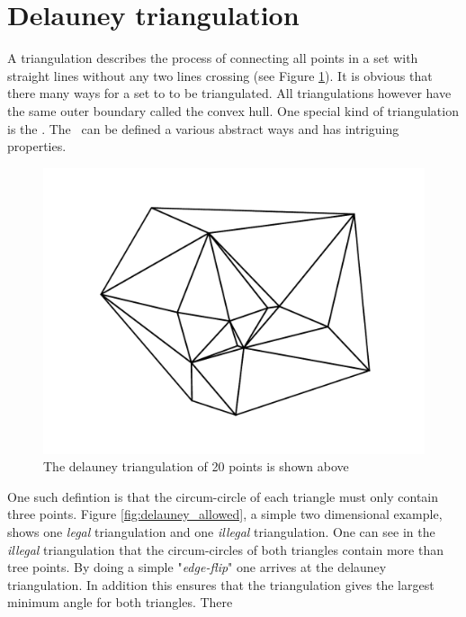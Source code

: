\section{Delauney triangulation}
\label{sec:delauney_tri}
A triangulation describes the process of connecting all points in a set with straight lines without any two lines crossing (see Figure \ref{fig:delauney_example}). It is obvious that there many ways for a set to to be triangulated. All triangulations however have the same outer boundary called the convex hull. One special kind of triangulation is the \deltri. The \deltri\ can be defined a various abstract ways and has intriguing properties.

\begin{figure}[htbp] %
   \centering
   \includegraphics[width=\textwidth]{chapter_ndinterp/plots/simple_delauney.pdf} 
   \caption{The delauney triangulation of 20 points is shown above}
   \label{fig:delauney_example}
\end{figure}


One such defintion is that the circum-circle of each triangle must only contain three points. Figure \ref{fig:delauney_allowed}, a simple two dimensional example, shows one \textit{legal} triangulation and one \textit{illegal} triangulation. One can see in the \textit{illegal} triangulation that the circum-circles of both triangles contain more than tree points. By doing a simple "\textit{edge-flip}" one arrives at the delauney triangulation. In addition this ensures that the triangulation gives the largest minimum angle for both triangles. 
There

